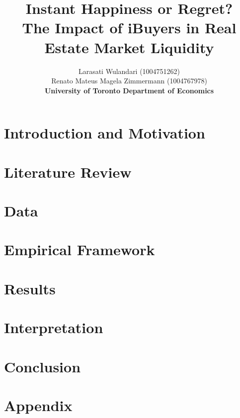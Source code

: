 \documentclass{article}
\title{Instant Happiness or Regret? \\
\Large The Impact of iBuyers in Real Estate Market Liquidity \\
}
\author{
    Larasati Wulandari (1004751262) \\
    Renato Mateus Magela Zimmermann (1004767978)    \\
    \small{\textbf{University of Toronto Department of Economics}}
}
\begin{document}
\doublespacing

\maketitle
\pagebreak



\section{Introduction and Motivation}



\section{Literature Review}




%

\section{Data}



\section{Empirical Framework}\label{empirical_framework}



\section{Results}



\section{Interpretation}



\section{Conclusion}



\medskip
\printbibliography

\pagebreak
\onecolumn

\section{Appendix}


\end{document}
